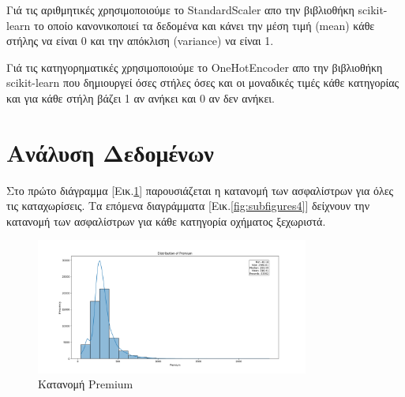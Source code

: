 \documentclass{llncs}
\begin{document}
Γιά τις αριθμητικές χρησιμοποιούμε το StandardScaler απο την βιβλιοθήκη scikit-learn το 
οποίο κανονικοποιεί τα δεδομένα και κάνει την μέση τιμή (mean) κάθε στήλης να είναι 0 και
την απόκλιση (variance) να είναι 1.

Γιά τις κατηγορηματικές χρησιμοποιούμε το OneHotEncoder απο την βιβλιοθήκη scikit-learn 
που δημιουργεί όσες στήλες όσες και οι μοναδικές τιμές κάθε κατηγορίας και για κάθε στήλη 
βάζει 1 αν ανήκει και 0 αν δεν ανήκει.

\section{Ανάλυση Δεδομένων}
Στο πρώτο διάγραμμα [Εικ.\ref{fig:prem}] παρουσιάζεται η κατανομή των ασφαλίστρων για όλες τις καταχωρίσεις. Τα επόμενα διαγράμματα [Εικ.\ref{fig:subfigures4}] δείχνουν την κατανομή των ασφαλίστρων για κάθε κατηγορία οχήματος ξεχωριστά.
\begin{figure}
    \begin{center}
        \includegraphics[width=0.8\textwidth]{images/premium.png}
    \end{center}
    \caption{Κατανομή Premium} 
    \label{fig:prem}   
\end{figure}
\end{document}
